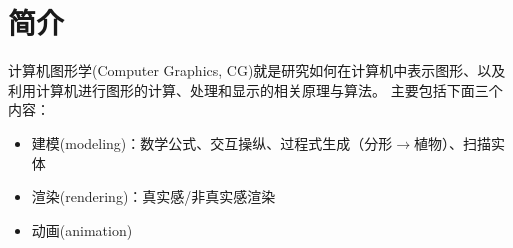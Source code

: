 
\section{简介}
计算机图形学(Computer Graphics, CG)就是研究如何在计算机中表示图形、以及利用计算机进行图形的计算、处理和显示的相关原理与算法。
主要包括下面三个内容：
\begin{itemize}
	\item 建模(modeling)：数学公式、交互操纵、过程式生成（分形$\to$植物）、扫描实体
	\item 渲染(rendering)：真实感/非真实感渲染
	\item 动画(animation)
\end{itemize}